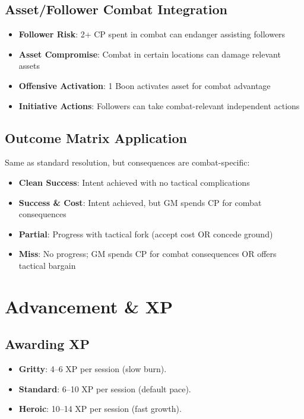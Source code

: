 \documentclass[11pt]{article}
\begin{document}
\subsection{Asset/Follower Combat Integration}
\begin{itemize}
    \item \textbf{Follower Risk}: 2+ CP spent in combat can endanger assisting followers
    \item \textbf{Asset Compromise}: Combat in certain locations can damage relevant assets  
    \item \textbf{Offensive Activation}: 1 Boon activates asset for combat advantage
    \item \textbf{Initiative Actions}: Followers can take combat-relevant independent actions
\end{itemize}

\subsection{Outcome Matrix Application}
Same as standard resolution, but consequences are combat-specific:
\begin{itemize}
    \item \textbf{Clean Success}: Intent achieved with no tactical complications
    \item \textbf{Success \& Cost}: Intent achieved, but GM spends CP for combat consequences
    \item \textbf{Partial}: Progress with tactical fork (accept cost OR concede ground)
    \item \textbf{Miss}: No progress; GM spends CP for combat consequences OR offers tactical bargain
\end{itemize}

\section{Advancement \& XP}

\subsection{Awarding XP}
\begin{itemize}
    \item \textbf{Gritty}: 4–6 XP per session (slow burn).
    \item \textbf{Standard}: 6–10 XP per session (default pace).
    \item \textbf{Heroic}: 10–14 XP per session (fast growth).
\end{itemize}
\end{document}
